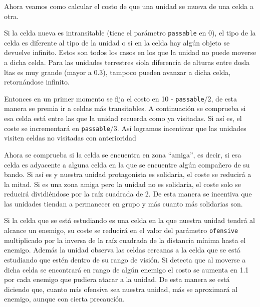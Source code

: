 Ahora veamos como calcular el costo de que una unidad se mueva de una celda a otra.
 
Si la celda nueva es intransitable (tiene el par\'ametro \verb|passable| en 0), el tipo de la celda es diferente al tipo de la unidad o si en la celda hay alg\'un objeto se devuelve infinito. Estos son todos los casos en los que la unidad no puede moverse a dicha celda. Para las unidades terrestres siola diferencia de alturas entre dosla ltas es muy grande (mayor a 0.3), tampoco pueden avanzar a dicha celda, retorn\'andose infinito. 
 
Entonces en un primer momento se fija el costo en 10 - \verb|passable|/2, de esta manera se premia ir a celdas m\'as transitables. A continuaci\'on se comprueba si esa celda est\'a entre las que la unidad recuerda como ya visitadas. Si as\'i es, el coste se incrementar\'a en \verb|passable|/3. As\'i logramos incentivar que las unidades visiten celdas no visitadas con anterioridad  
  
Ahora se comprueba si la celda se encuentra en zona ``amiga'', es decir, si esa celda es adyacente a alguna celda en la que se encuentre alg\'un compa\~{n}ero de su bando. Si as\'i es y nuestra unidad protagonista es solidaria, el coste se reducir\'a a la mitad. Si es una zona amiga pero la unidad no es solidaria, el coste solo se reducir\'a dividi\'endose por la ra\'iz cuadrada de 2. De esta manera se incentiva que las unidades tiendan a permanecer en grupo y m\'as cuanto m\'as solidarias son.

Si la celda que se est\'a estudiando es una celda en la que nuestra unidad tendr\'a al alcance un enemigo, su coste se reducir\'a en el valor del par\'ametro \verb|ofensive|  multiplicado por la inversa de la ra\'iz cuadrada de la distancia m\'inima hasta el enemigo. Adem\'as la unidad observa las celdas cercanas a la celda que se est\'a estudiando que est\'en dentro de su rango de visi\'on. Si detecta que al moverse a dicha celda se encontrar\'a en rango de alg\'un enemigo el costo se aumenta en 1.1 por cada enemigo que pudiera atacar a la unidad. De esta manera se est\'a diciendo que, cuanto m\'as ofensiva sea nuestra unidad, m\'as se aproximar\'a al enemigo, aunque con cierta precauci\'on.  
